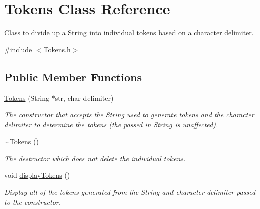 \hypertarget{class_tokens}{}\section{Tokens Class Reference}
\label{class_tokens}


Class to divide up a String into individual tokens based on a character delimiter.  




{\ttfamily \#include $<$Tokens.\+h$>$}

\subsection*{Public Member Functions}
\begin{DoxyCompactItemize}
\item 
\mbox{\label{class_tokens_a326b0694ea391f608f9cc71fe236c3bc}} 
\hyperlink{class_tokens_a326b0694ea391f608f9cc71fe236c3bc}{Tokens} (String $\ast$str, char delimiter)
\begin{DoxyCompactList}\small\item\em The constructor that accepts the String used to generate tokens and the character delimiter to determine the tokens (the passed in String is unaffected). \end{DoxyCompactList}\item 
\mbox{\label{class_tokens_acd11b5f66d858705695a122151ba1f0d}} 
\hyperlink{class_tokens_acd11b5f66d858705695a122151ba1f0d}{$\sim$\+Tokens} ()
\begin{DoxyCompactList}\small\item\em The destructor which does not delete the individual tokens. \end{DoxyCompactList}\item 
\mbox{\label{class_tokens_aad54aaf40815db1e85811b58d02b2531}} 
void \hyperlink{class_tokens_aad54aaf40815db1e85811b58d02b2531}{display\+Tokens} ()
\begin{DoxyCompactList}\small\item\em Display all of the tokens generated from the String and character delimiter passed to the constructor. \end{DoxyCompactList}\item 
\mbox{\label{class_tokens_ab7afcc723baf9f48a9150a2f2d8bb2e5}} 

\end{DoxyCompactItemize}
